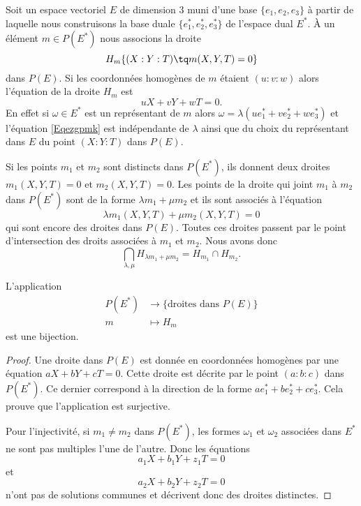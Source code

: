 Soit un espace vectoriel \( E\) de dimension \( 3\) muni d'une base \( \{ e_1,e_2,e_3 \}\) à partir de laquelle nous construisons la base duale \( \{ e_1^*,e_2^*,e_3^* \}\) de l'espace dual \( E^*\). À un élément \( m\in P(E^*)\) nous associons la droite
\begin{equation}
    H_m\{ (X:Y:T)\tq m(X,Y,T)=0 \}
\end{equation}
dans \( P(E)\). Si les coordonnées homogènes de \( m\) étaient \( (u:v:w)\) alors l'équation de la droite \( H_m\) est
\begin{equation}    \label{Eqezgpmk}
    uX+vY+wT=0.
\end{equation}
En effet si \( \omega\in E^*\) est un représentant de \( m\) alors \( \omega=\lambda(ue_1^*+ve_2^*+we_3^*)\) et l'équation \eqref{Eqezgpmk} est indépendante de \( \lambda\) ainsi que du choix du représentant dans \( E\) du point \( (X:Y:T)\) dans \( P(E)\).

Si les points \( m_1\) et \( m_2\) sont distincts dans \( P(E^*)\), ils donnent deux droites \( m_1(X,Y,T)=0\) et \( m_2(X,Y,T)=0\). Les points de la droite qui joint \( m_1\) à \( m_2\) dans \( P(E^*)\) sont de la forme \( \lambda m_1+\mu m_2\) et ils sont associés à l'équation
\begin{equation}
    \lambda m_1(X,Y,T)+\mu m_2(X,Y,T)=0
\end{equation}
qui sont encore des droites dans \( P(E)\). Toutes ces droites passent par le point d'intersection des droits associées à \( m_1\) et \( m_2\). Nous avons donc
\begin{equation}
    \bigcap_{\lambda,\mu}H_{\lambda m_1+\mu m_2}=H_{m_1}\cap H_{m_2}.
\end{equation}

\begin{lemma}
    L'application
    \begin{equation}
        \begin{aligned}
            P(E^*)&\to \{ \text{droites dans } P(E) \} \\
            m&\mapsto H_m
        \end{aligned}
    \end{equation}
    est une bijection.
\end{lemma}

\begin{proof}
    Une droite dans \( P(E)\) est donnée en coordonnées homogènes par une équation \( aX+bY+cT=0\). Cette droite est décrite par le point \( (a:b:c)\) dans \( P(E^*)\). Ce dernier correspond à la direction de la forme \( ae_1^*+be_2^*+ce_3^*\). Cela prouve que l'application est surjective.

    Pour l'injectivité, si \( m_1\neq m_2\) dans \( P(E^*)\), les formes \( \omega_1\) et \( \omega_2\) associées dans \( E^*\) ne sont pas multiples l'une de l'autre. Donc les équations
    \begin{equation}
        a_1X+b_1Y+z_1T=0
    \end{equation}
    et
    \begin{equation}
        a_2X+b_2Y+z_2T=0
    \end{equation}
    n'ont pas de solutions communes et décrivent donc des droites distinctes.
\end{proof}

